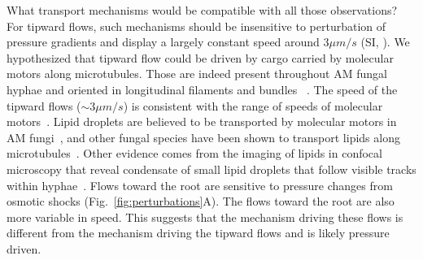 
What transport mechanisms would be compatible with all those observations? For tipward flows, such mechanisms should be insensitive to perturbation of pressure gradients and display a largely constant speed around $3\mu m/s$ (SI, ).
We hypothesized that tipward flow could be driven by cargo carried by molecular motors along microtubules. Those are indeed present throughout AM fungal hyphae and oriented in longitudinal filaments and bundles ~\cite{timonen_microtubules_2001}. The speed of the tipward flows ($\sim3\mu m/s$) is consistent with the range of speeds of molecular motors~\cite{steinberg_cell_2017}.
Lipid droplets are believed to be transported by molecular motors in AM fungi~\cite{bago_translocation_2002}, and other fungal species have been shown to transport lipids along microtubules~\cite{guimaraes_peroxisomes_2015, lin_active_2016}.
Other evidence comes from the imaging of lipids in confocal microscopy that reveal condensate of small lipid droplets that follow visible tracks within hyphae~\cite{sister_lipid_droplets_inprep}.
Flows toward the root are sensitive to pressure changes from osmotic shocks (Fig.~\ref{fig:perturbations}A).
The flows toward the root are also more variable in speed.
This suggests that the mechanism driving these flows is different from the mechanism driving the tipward flows and is likely pressure driven.

